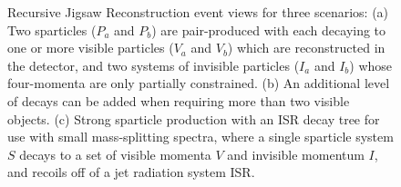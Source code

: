 \begin{figure}[tb]
\centering
{}
\caption{\label{fig:RJRTrees} Recursive Jigsaw Reconstruction event views for three scenarios: (a) Two sparticles ($P_{a}$ and $P_{b}$) are pair-produced with each decaying to one or more visible particles ($V_{a}$ and $V_{b}$) which are reconstructed in the detector, and two systems of invisible particles ($I_{a}$ and $I_{b}$) whose four-momenta are only partially constrained. (b) An additional level of decays can be added when requiring more than two visible objects. (c) Strong sparticle production with an ISR decay tree for use with small mass-splitting spectra, where a single sparticle system $S$ decays to a set of visible momenta $V$ and invisible momentum $I$, and recoils off of a jet radiation system ISR.
}
\end{figure}

